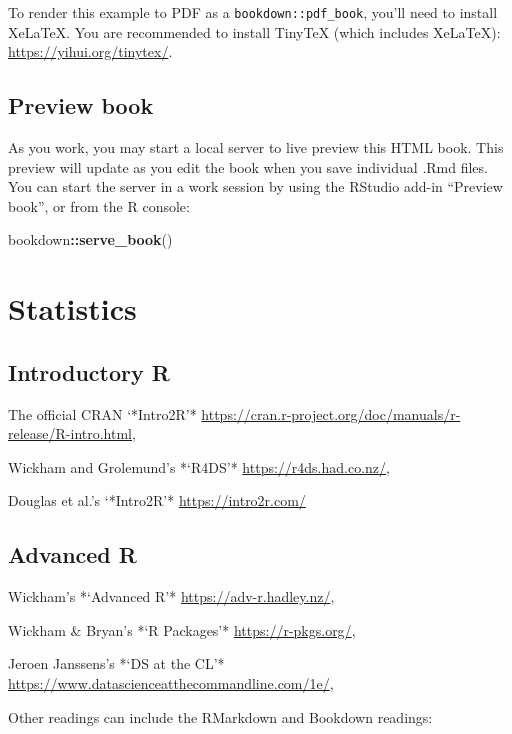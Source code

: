 \documentclass[
]{book}
\newenvironment{Shaded}{\begin{snugshade}}{\end{snugshade}}
\newcommand{\FunctionTok}[1]{\textcolor[rgb]{0.13,0.29,0.53}{\textbf{#1}}}
\newcommand{\NormalTok}[1]{#1}
\newcommand{\SpecialCharTok}[1]{\textcolor[rgb]{0.81,0.36,0.00}{\textbf{#1}}}
\begin{document}
To render this example to PDF as a \texttt{bookdown::pdf\_book}, you'll need to install XeLaTeX. You are recommended to install TinyTeX (which includes XeLaTeX): \url{https://yihui.org/tinytex/}.

\section{Preview book}\label{preview-book}

As you work, you may start a local server to live preview this HTML book. This preview will update as you edit the book when you save individual .Rmd files. You can start the server in a work session by using the RStudio add-in ``Preview book'', or from the R console:

\begin{Shaded}
\begin{Highlighting}[]
\NormalTok{bookdown}\SpecialCharTok{::}\FunctionTok{serve\_book}\NormalTok{()}
\end{Highlighting}
\end{Shaded}

\chapter{Statistics}\label{statistics}

\section{Introductory R}\label{introductory-r}

The official CRAN `*Intro2R'* \url{https://cran.r-project.org/doc/manuals/r-release/R-intro.html},

Wickham and Grolemund's *`R4DS'* \url{https://r4ds.had.co.nz/},

Douglas et al.'s `*Intro2R'* \url{https://intro2r.com/}

\section{Advanced R}\label{advanced-r}

Wickham's *`Advanced R'* \url{https://adv-r.hadley.nz/},

Wickham \& Bryan's *`R Packages'* \url{https://r-pkgs.org/},

Jeroen Janssens's *`DS at the CL'* \url{https://www.datascienceatthecommandline.com/1e/},

Other readings can include the RMarkdown and Bookdown readings:
\end{document}
